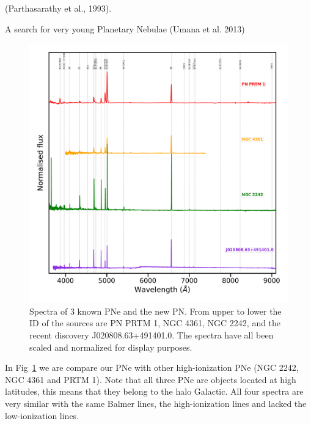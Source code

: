 \documentclass[fleqn,usenatbib]{mnras}
\begin{document}
(Parthasarathy et al., 1993). {\cs A search for very young
  Planetary Nebulae (Umana et al. 2013)

\begin{figure}
\centering
\includegraphics[width=\linewidth]{Figs/spectra-compare.pdf}
\caption{Spectra of 3 known PNe and the new PN. From upper to lower the ID of the
  sources are PN PRTM 1, NGC 4361, NGC 2242, and the recent discovery J020808.63+491401.0.
  The spectra have all been scaled and normalized for display purposes.} 
  \label{fig:compare-spectra}
\end{figure}

In Fig~\ref{fig:compare-spectra} we are compare our PNe with
other high-ionization PNe (NGC 2242, NGC 4361 and PRTM 1).
Note that all three PNe are objects located at high latitudes,
this means that they belong to the halo Galactic.
All four spectra are very similar with the same Balmer lines,
the high-ionization lines and lacked the low-ionization lines.

}
\end{document}
